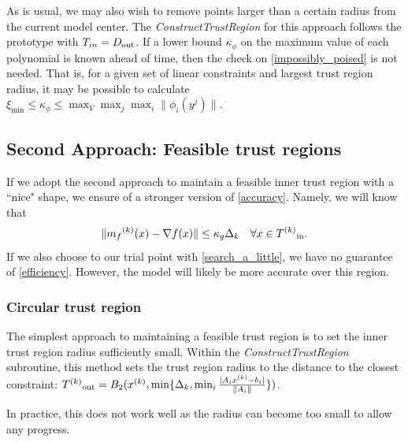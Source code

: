 As is usual, we may also wish to remove points larger than a certain radius from the current model center.
The \emph{ConstructTrustRegion} for this approach follows the prototype with $T_{in} = D_{\text{out}}$.
If a lower bound $\kappa_{\phi}$ on the maximum value of each polynomial is known ahead of time, then the check on \cref{impossibly_poised} is not needed.
That is, for a given set of linear constraints and largest trust region radius, it may be possible to calculate $\xi_{\text{min}} \le \kappa_{\phi} \le \max_{V}\max_{j}\max_{i}\|\phi_i(y^j)\|$.






\subsection{Second Approach: Feasible trust regions}

If we adopt the second approach to maintain a feasible inner trust region with a ``nice" shape, we ensure of a stronger version of \cref{accuracy}.
Namely, we will know that 
\[
    \|{{m}_f}^{(k)}(x) - \nabla f(x) \| \le \kappa_g \Delta_{k} \quad \forall x \in {T^{(k)}}_{\text{in}}.
\]
If we also choose to our trial point with \cref{search_a_little}, we have no guarantee of \cref{efficiency}.
However, the model will likely be more accurate over this region.


\subsubsection{Circular trust region}
The simplest approach to maintaining a feasible trust region is to set the inner trust region radius sufficiently small.
Within the \emph{ConstructTrustRegion} subroutine, this method sets the trust region radius to the distance to the closest constraint:
${T^{(k)}}_{\text{out}} = B_2({x}^{(k)}, \min\{\Delta_k, \min_{i}\frac{|A_i{x}^{(k)} - b_i|}{\|A_i\|} \})$.

In practice, this does not work well as the radius can become too small to allow any progress.

